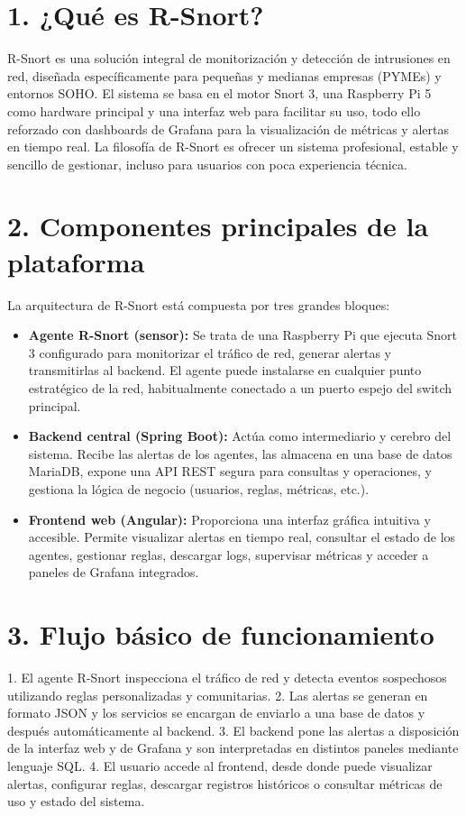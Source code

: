 \documentclass[11pt,a4paper,twoside]{report}
\begin{document}
\section*{1. ¿Qué es R-Snort?}

R-Snort es una solución integral de monitorización y detección de intrusiones en red, diseñada específicamente para pequeñas y medianas empresas (PYMEs) y entornos SOHO. El sistema se basa en el motor Snort 3, una Raspberry Pi 5 como hardware principal y una interfaz web para facilitar su uso, todo ello reforzado con dashboards de Grafana para la visualización de métricas y alertas en tiempo real. La filosofía de R-Snort es ofrecer un sistema profesional, estable y sencillo de gestionar, incluso para usuarios con poca experiencia técnica.

\section*{2. Componentes principales de la plataforma}

La arquitectura de R-Snort está compuesta por tres grandes bloques:

\begin{itemize}
	\item \textbf{Agente R-Snort (sensor):} Se trata de una Raspberry Pi que ejecuta Snort 3 configurado para monitorizar el tráfico de red, generar alertas y transmitirlas al backend. El agente puede instalarse en cualquier punto estratégico de la red, habitualmente conectado a un puerto espejo del switch principal.
	\item \textbf{Backend central (Spring Boot):} Actúa como intermediario y cerebro del sistema. Recibe las alertas de los agentes, las almacena en una base de datos MariaDB, expone una API REST segura para consultas y operaciones, y gestiona la lógica de negocio (usuarios, reglas, métricas, etc.).
	\item \textbf{Frontend web (Angular):} Proporciona una interfaz gráfica intuitiva y accesible. Permite visualizar alertas en tiempo real, consultar el estado de los agentes, gestionar reglas, descargar logs, supervisar métricas y acceder a paneles de Grafana integrados.
\end{itemize}

\section*{3. Flujo básico de funcionamiento}

1. El agente R-Snort inspecciona el tráfico de red y detecta eventos sospechosos utilizando reglas personalizadas y comunitarias.
2. Las alertas se generan en formato JSON y los servicios se encargan de enviarlo a una base de datos y después automáticamente al backend.
3. El backend pone las alertas a disposición de la interfaz web y de Grafana y son interpretadas en distintos paneles mediante lenguaje SQL.
4. El usuario accede al frontend, desde donde puede visualizar alertas, configurar reglas, descargar registros históricos o consultar métricas de uso y estado del sistema.
\end{document}

